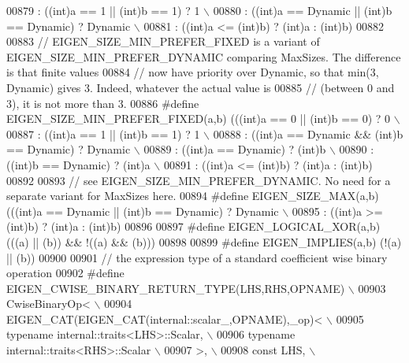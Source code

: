\begin{DoxyCode}
00879 \textcolor{preprocessor}{                           : ((int)a == 1 || (int)b == 1) ? 1 \(\backslash\)}
00880 \textcolor{preprocessor}{                           : ((int)a == Dynamic || (int)b == Dynamic) ? Dynamic \(\backslash\)}
00881 \textcolor{preprocessor}{                           : ((int)a <= (int)b) ? (int)a : (int)b)}
00882 
00883 \textcolor{comment}{// EIGEN\_SIZE\_MIN\_PREFER\_FIXED is a variant of EIGEN\_SIZE\_MIN\_PREFER\_DYNAMIC comparing MaxSizes. The
       difference is that finite values}
00884 \textcolor{comment}{// now have priority over Dynamic, so that min(3, Dynamic) gives 3. Indeed, whatever the actual value is}
00885 \textcolor{comment}{// (between 0 and 3), it is not more than 3.}
00886 \textcolor{preprocessor}{#define EIGEN\_SIZE\_MIN\_PREFER\_FIXED(a,b)  (((int)a == 0 || (int)b == 0) ? 0 \(\backslash\)}
00887 \textcolor{preprocessor}{                           : ((int)a == 1 || (int)b == 1) ? 1 \(\backslash\)}
00888 \textcolor{preprocessor}{                           : ((int)a == Dynamic && (int)b == Dynamic) ? Dynamic \(\backslash\)}
00889 \textcolor{preprocessor}{                           : ((int)a == Dynamic) ? (int)b \(\backslash\)}
00890 \textcolor{preprocessor}{                           : ((int)b == Dynamic) ? (int)a \(\backslash\)}
00891 \textcolor{preprocessor}{                           : ((int)a <= (int)b) ? (int)a : (int)b)}
00892 
00893 \textcolor{comment}{// see EIGEN\_SIZE\_MIN\_PREFER\_DYNAMIC. No need for a separate variant for MaxSizes here.}
00894 \textcolor{preprocessor}{#define EIGEN\_SIZE\_MAX(a,b) (((int)a == Dynamic || (int)b == Dynamic) ? Dynamic \(\backslash\)}
00895 \textcolor{preprocessor}{                           : ((int)a >= (int)b) ? (int)a : (int)b)}
00896 
00897 \textcolor{preprocessor}{#define EIGEN\_LOGICAL\_XOR(a,b) (((a) || (b)) && !((a) && (b)))}
00898 
00899 \textcolor{preprocessor}{#define EIGEN\_IMPLIES(a,b) (!(a) || (b))}
00900 
00901 \textcolor{comment}{// the expression type of a standard coefficient wise binary operation}
00902 \textcolor{preprocessor}{#define EIGEN\_CWISE\_BINARY\_RETURN\_TYPE(LHS,RHS,OPNAME) \(\backslash\)}
00903 \textcolor{preprocessor}{    CwiseBinaryOp< \(\backslash\)}
00904 \textcolor{preprocessor}{      EIGEN\_CAT(EIGEN\_CAT(internal::scalar\_,OPNAME),\_op)< \(\backslash\)}
00905 \textcolor{preprocessor}{          typename internal::traits<LHS>::Scalar, \(\backslash\)}
00906 \textcolor{preprocessor}{          typename internal::traits<RHS>::Scalar \(\backslash\)}
00907 \textcolor{preprocessor}{      >, \(\backslash\)}
00908 \textcolor{preprocessor}{      const LHS, \(\backslash\)}

\end{DoxyCode}
